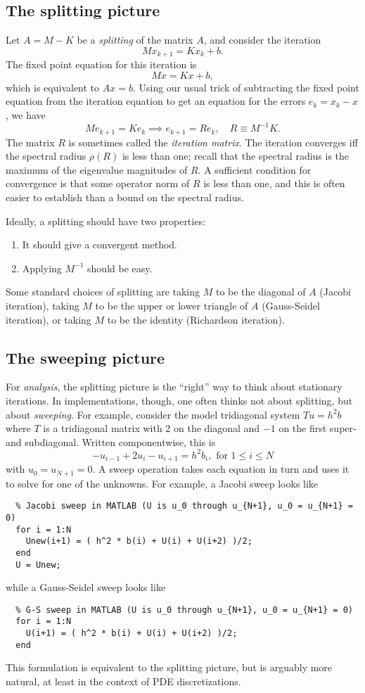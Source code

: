 \documentclass[12pt, leqno]{article}
\begin{document}
\subsection{The splitting picture}

Let $A = M-K$ be a {\em splitting} of the matrix $A$, and consider
the iteration
\[
  M x_{k+1} = K x_k + b.
\]
The fixed point equation for this iteration is
\[
  Mx = Kx + b,
\]
which is equivalent to $Ax = b$.  Using our usual trick of subtracting
the fixed point equation from the iteration equation to get an
equation for the errors $e_k = x_k-x$, we have
\[
  M e_{k+1} = K e_k \implies e_{k+1} = R e_k, \quad R \equiv M^{-1} K.
\]
The matrix $R$ is sometimes called the {\em iteration matrix}.  The
iteration converges iff the spectral radius $\rho(R)$ is less than one;
recall that the spectral radius is the maximum of the eigenvalue
magnitudes of $R$.  A sufficient condition for convergence is that
some operator norm of $R$ is less than one, and this is often easier
to establish than a bound on the spectral radius.

Ideally, a splitting should have two properties:
\begin{enumerate}
\item It should give a convergent method.
\item Applying $M^{-1}$ should be easy.
\end{enumerate}
Some standard choices of splitting are taking $M$ to be the diagonal
of $A$ (Jacobi iteration), taking $M$ to be the upper or lower
triangle of $A$ (Gauss-Seidel iteration), or taking $M$ to be
the identity (Richardson iteration).

\subsection{The sweeping picture}

For {\em analysis}, the splitting picture is the ``right'' way to
think about stationary iterations.  In implementations, though, one often
thinks not about splitting, but about {\em sweeping}.  For example,
consider the model tridiagonal system $Tu = h^2 b$ where $T$ is a
tridiagonal matrix with $2$ on the diagonal and $-1$ on the first
super- and subdiagonal.  Written componentwise, this is
\[
  -u_{i-1} + 2 u_i - u_{i+1} = h^2 b_i, \mbox{ for } 1 \leq i \leq N
\]
with $u_0 = u_{N+1} = 0$.  A sweep operation takes each equation in
turn and uses it to solve for one of the unknowns.  For example,
a Jacobi sweep looks like
\begin{lstlisting}
  % Jacobi sweep in MATLAB (U is u_0 through u_{N+1}, u_0 = u_{N+1} = 0)
  for i = 1:N
    Unew(i+1) = ( h^2 * b(i) + U(i) + U(i+2) )/2;
  end
  U = Unew;
\end{lstlisting}
while a Gauss-Seidel sweep looks like
\begin{lstlisting}
  % G-S sweep in MATLAB (U is u_0 through u_{N+1}, u_0 = u_{N+1} = 0)
  for i = 1:N
    U(i+1) = ( h^2 * b(i) + U(i) + U(i+2) )/2;
  end
\end{lstlisting}
This formulation is equivalent to the splitting picture, but is
arguably more natural, at least in the context of PDE discretizations.
\end{document}
